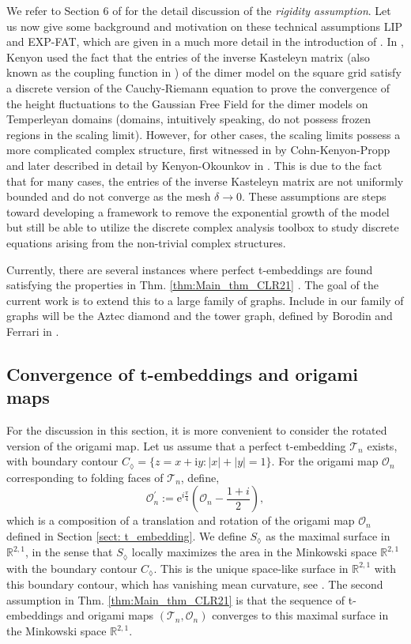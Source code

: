 \documentclass[12pt]{amsart}
\newcommand{\cT}{\mathcal T}
\newcommand{\cO}{\mathcal O}
\newcommand{\R}{{\mathbb R}}
\numberwithin{equation}{section}
\theoremstyle{definition}
\begin{document}
We refer to Section 6 of \cite{tower_AD_perfect} for the detail discussion of the \emph{rigidity assumption}. Let us now give some background and motivation on these technical assumptions LIP and EXP-FAT, which are given in a much more detail in the introduction of \cite{MR4588721}. In \cite{Ken00, Ken01}, Kenyon used the fact that the entries of the inverse Kasteleyn matrix (also known as the coupling function in \cite{Ken00}) of the dimer model on the square grid satisfy a discrete version of the Cauchy-Riemann equation to prove the convergence of the height fluctuations to the Gaussian Free Field for the dimer models on Temperleyan domains (domains, intuitively speaking, do not possess frozen regions in the scaling limit). However, for other cases, the scaling limits possess a more complicated complex structure, first witnessed in \cite{CKP} by Cohn-Kenyon-Propp and later described in detail by Kenyon-Okounkov in \cite{OK1}. This is due to the fact that for many cases, the entries of the inverse Kasteleyn matrix are not uniformly bounded and do not converge as the mesh $\delta \to 0$. These assumptions are steps toward developing a framework to remove the exponential growth of the model but still be able to utilize the discrete complex analysis toolbox to study discrete equations arising from the non-trivial complex structures. 

Currently, there are several instances where perfect t-embeddings are found satisfying the properties in Thm. \ref{thm:Main_thm_CLR21} \cite{tower_AD_perfect,berggren2024perfecttembeddingslozengetilings,berggren2025perfecttembeddingsdoublyperiodic}. The goal of the current work is to extend this to a large family of graphs.  Include in our family of graphs will be the Aztec diamond and the tower graph, defined by Borodin and Ferrari in \cite{MR3821250}. 


\subsection{Convergence of t-embeddings and origami maps}
For the discussion in this section, it is more convenient to consider the rotated version of the origami map. Let us assume that a perfect t-embedding $\cT_n$ exists, with boundary contour $C_\lozenge = \{z=x+\mathrm i y:|x|+|y|=1 \}$. For the origami map $\cO_n$ corresponding to folding faces of $\cT_n$, define,
$$
\mathcal{O}_n^{\prime}:=\mathrm{e}^{i \frac{\pi}{4}}\left(\mathcal{O}_n-\frac{1+i}{2}\right),
$$
which is a composition of a translation and rotation of the origami map $\mathcal{O}_n$ defined in Section \ref{sect: t_embedding}. We define $S_{\lozenge}$ as the maximal surface in $\R^{2,1}$, in the sense that $S_\lozenge$ locally maximizes the area in the Minkowski space $\mathbb{R}^{2,1}$ with the boundary contour $C_{\lozenge}$. This is the unique space-like surface in $\mathbb{R}^{2,1}$ with this boundary contour, which has vanishing mean curvature, see \cite{Kobayashi83}.
The second assumption in Thm.  \ref{thm:Main_thm_CLR21} is that the sequence of t-embeddings and origami maps $(\cT_n,\cO_n )$  converges to 
this maximal surface in the Minkowski space $\R^{2,1}$. 
\end{document}
